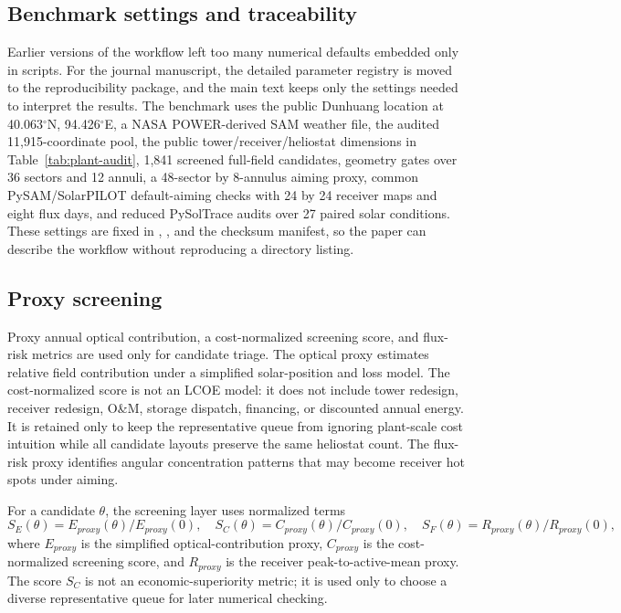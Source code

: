 \documentclass[final,3p,times]{elsarticle}
\begin{document}
\subsection{Benchmark settings and traceability}
Earlier versions of the workflow left too many numerical defaults embedded only in scripts. For the journal manuscript, the detailed parameter registry is moved to the reproducibility package, and the main text keeps only the settings needed to interpret the results. The benchmark uses the public Dunhuang location at 40.063$^\circ$N, 94.426$^\circ$E, a NASA POWER-derived SAM weather file, the audited 11,915-coordinate pool, the public tower/receiver/heliostat dimensions in Table~\ref{tab:plant-audit}, 1,841 screened full-field candidates, geometry gates over 36 sectors and 12 annuli, a 48-sector by 8-annulus aiming proxy, common PySAM/SolarPILOT default-aiming checks with 24 by 24 receiver maps and eight flux days, and reduced PySolTrace audits over 27 paired solar conditions. These settings are fixed in , , and the checksum manifest, so the paper can describe the workflow without reproducing a directory listing.

\subsection{Proxy screening}
Proxy annual optical contribution, a cost-normalized screening score, and flux-risk metrics are used only for candidate triage. The optical proxy estimates relative field contribution under a simplified solar-position and loss model. The cost-normalized score is not an LCOE model: it does not include tower redesign, receiver redesign, O\&M, storage dispatch, financing, or discounted annual energy. It is retained only to keep the representative queue from ignoring plant-scale cost intuition while all candidate layouts preserve the same heliostat count. The flux-risk proxy identifies angular concentration patterns that may become receiver hot spots under aiming.

For a candidate $\theta$, the screening layer uses normalized terms
\begin{equation}
S_E(\theta)=E_{proxy}(\theta)/E_{proxy}(0),\quad
S_C(\theta)=C_{proxy}(\theta)/C_{proxy}(0),\quad
S_F(\theta)=R_{proxy}(\theta)/R_{proxy}(0),
\end{equation}
where $E_{proxy}$ is the simplified optical-contribution proxy, $C_{proxy}$ is the cost-normalized screening score, and $R_{proxy}$ is the receiver peak-to-active-mean proxy. The score $S_C$ is not an economic-superiority metric; it is used only to choose a diverse representative queue for later numerical checking.
\end{document}
